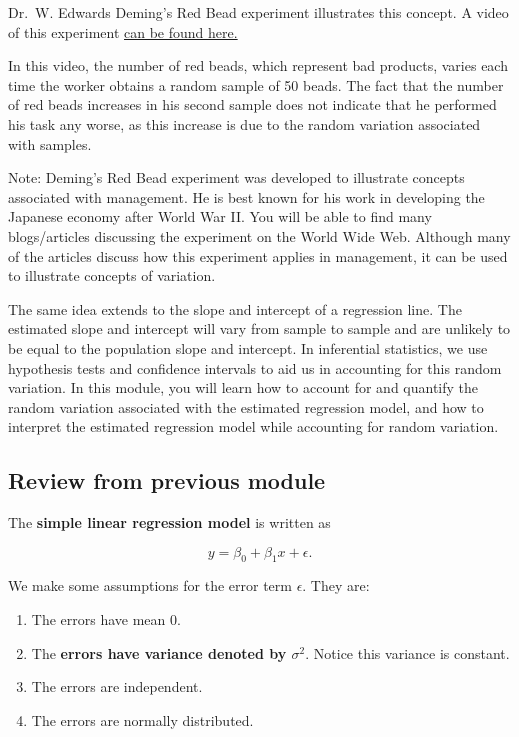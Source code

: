 \documentclass[
]{book}
\providecommand{\tightlist}{%
  \setlength{\itemsep}{0pt}\setlength{\parskip}{0pt}}
\begin{document}
Dr.~W. Edwards Deming's Red Bead experiment illustrates this concept. A video of this experiment \href{https://www.youtube.com/watch?v=R3ewHrpqclA}{can be found here.}

In this video, the number of red beads, which represent bad products, varies each time the worker obtains a random sample of 50 beads. The fact that the number of red beads increases in his second sample does not indicate that he performed his task any worse, as this increase is due to the random variation associated with samples.

Note: Deming's Red Bead experiment was developed to illustrate concepts associated with management. He is best known for his work in developing the Japanese economy after World War II. You will be able to find many blogs/articles discussing the experiment on the World Wide Web. Although many of the articles discuss how this experiment applies in management, it can be used to illustrate concepts of variation.

The same idea extends to the slope and intercept of a regression line. The estimated slope and intercept will vary from sample to sample and are unlikely to be equal to the population slope and intercept. In inferential statistics, we use hypothesis tests and confidence intervals to aid us in accounting for this random variation. In this module, you will learn how to account for and quantify the random variation associated with the estimated regression model, and how to interpret the estimated regression model while accounting for random variation.

\hypertarget{review-from-previous-module}{%
\subsection{Review from previous module}\label{review-from-previous-module}}

The \textbf{simple linear regression model} is written as

\begin{equation}
y=\beta_0+\beta_{1} x + \epsilon. 
\label{eq:4SLRmod}
\end{equation}

We make some assumptions for the error term \(\epsilon\). They are:

\begin{enumerate}
\def\labelenumi{\arabic{enumi}.}
\tightlist
\item
  The errors have mean 0.
\item
  The \textbf{errors have variance denoted by \(\sigma^2\)}. Notice this variance is constant.
\item
  The errors are independent.
\item
  The errors are normally distributed.
\end{enumerate}
\end{document}
